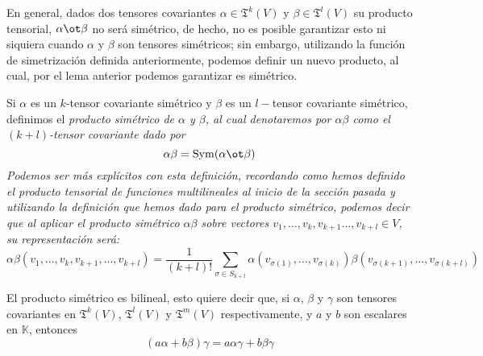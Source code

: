 En general, dados dos tensores covariantes $\alpha \in \mathfrak{T}^{k}(V)$ y
$\beta \in \mathfrak{T}^{l}(V)$ su producto tensorial, $\alpha \ot \beta$ no
será simétrico, de hecho, no es posible garantizar esto ni siquiera cuando
$\alpha$ y $\beta$ son tensores simétricos; sin embargo, utilizando la función
de simetrización definida anteriormente, podemos definir un nuevo producto, al
cual, por el lema anterior podemos garantizar es simétrico.

Si $\alpha$ es un $k$-tensor covariante simétrico y $\beta$ es un $l-$tensor
covariante simétrico, definimos el \it{producto simétrico de $\alpha$ y
	$\beta$}, al cual denotaremos por $\alpha \beta$ como el $(k+l)$-tensor
covariante dado por
\[
	\alpha \beta = \mathrm{Sym}(\alpha \ot \beta)
\]
Podemos ser más explícitos con esta definición, recordando como hemos definido el
producto tensorial de funciones multilineales al inicio de la sección pasada
y utilizando la definición que hemos dado para el producto simétrico, podemos
decir que al aplicar el producto simétrico $\alpha \beta$ sobre vectores
$v_1, \ldots, v_k, v_{k+1}\ldots, v_{k+l} \in V$, su representación será:
\[
	\alpha \beta(v_1, \ldots, v_k, v_{k+1}, \ldots, v_{k+l})
	=
	\frac{1}{(k+l)!}
	\sum_{\sigma \in S_{k+l}}
	\alpha(v_{\sigma(1)}, \ldots, v_{\sigma(k)})
	\beta(v_{\sigma(k+1)}, \ldots, v_{\sigma(k+l)})
\]

\begin{lemma}
	El producto simétrico es bilineal, esto quiere decir que, si $\alpha$,
	$\beta$ y $\gamma$ son tensores covariantes en $\mathfrak{T}^{k}(V)$,
	$\mathfrak{T}^{l}(V)$ y $\mathfrak{T}^{m}(V)$ respectivamente, y $a$ y $b$ son
	escalares en $\mathbb{K}$, entonces
	\[
		(a \alpha + b \beta)\gamma = a \alpha \gamma + b \beta \gamma
	\]
\end{lemma}

